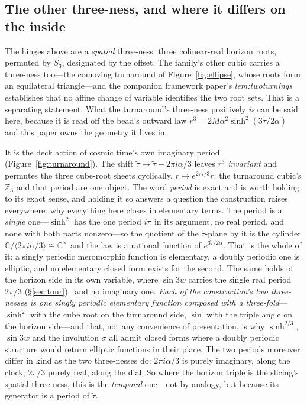 \documentclass[11pt,a4paper]{article}
\theoremstyle{definition}
\begin{document}
\subsection{The other three-ness, and where it differs on the inside}\label{sec:temporal-threeness}
The hinges above are a \emph{spatial} three-ness: three colinear-real horizon roots, permuted by $S_{3}$, designated by the offset. The family's other cubic carries a three-ness too---the comoving turnaround of Figure~\ref{fig:ellipse}, whose roots form an equilateral triangle---and the companion framework paper's \emph{lem:twoturnings} establishes that no affine change of variable identifies the two root sets. That is a separating statement. What the turnaround's three-ness positively \emph{is} can be said here, because it is read off the bead's outward law $r^{3}=2M\alpha^{2}\sinh^{2}(3\tilde\tau/2\alpha)$ and this paper owns the geometry it lives in.

It is the deck action of cosmic time's own imaginary period (Figure~\ref{fig:turnaround}). The shift $\tilde\tau\mapsto\tilde\tau+2\pi i\alpha/3$ leaves $r^{3}$ \emph{invariant} and permutes the three cube-root sheets cyclically, $r\mapsto e^{2\pi i/3}r$: the turnaround cubic's $\mathbb{Z}_{3}$ and that period are one object. The word \emph{period} is exact and is worth holding to its exact sense, and holding it
so answers a question the construction raises everywhere: why everything here closes in elementary terms. The
period is a \emph{single} one---$\sinh^{2}$ has the one period $i\pi$ in its argument, no real period, and none
with both parts nonzero---so the quotient of the $\tilde\tau$-plane by it is the cylinder
$\mathbb{C}/\langle 2\pi i\alpha/3\rangle\cong\mathbb{C}^{\times}$ and the law is a rational function of
$e^{3\tilde\tau/2\alpha}$. That is the whole of it: a singly periodic meromorphic
function is elementary, a doubly periodic one is elliptic, and no elementary closed form exists for the second.
The same holds of the horizon side in its own variable, where $\sin 3w$ carries the single real period $2\pi/3$
(\S\ref{sec:tour})~\cite{JanzenGroupoid} and no imaginary one. \emph{Each of the construction's two three-nesses
is one singly periodic elementary function composed with a three-fold}---$\sinh^{2}$ with the cube root on the
turnaround side, $\sin$ with the triple angle on the horizon side---and that, not any convenience of
presentation, is why $\sinh^{2/3}$, $\sin 3w$ and the involution $\sigma$ all admit closed forms where a
doubly periodic structure would return elliptic functions in their place. The two periods moreover differ in kind
as the two three-nesses do: $2\pi i\alpha/3$ is purely imaginary, along the clock; $2\pi/3$ purely real, along the
dial. So where the horizon triple is the slicing's spatial three-ness, this is the \emph{temporal} one---not by analogy, but because its generator is a period of $\tilde\tau$.
\end{document}
